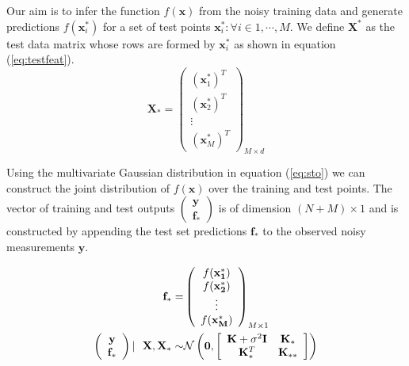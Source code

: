 Our aim is to infer the function $f(\mathbf{x})$ from the noisy training data and generate predictions $f(\mathbf{x}^{*}_i)$ for a set of test points $ {\mathbf{x}^{*}_i : \forall i \in 1, \cdots, M} $. We define $\mathbf{X}^*$ as the test data matrix whose rows are formed by $\mathbf{x}^{*}_i$ as shown in equation (\ref{eq:testfeat}). 
\begin{equation}
    \mathbf{X}_* = \left( \begin{array}{c} (\mathbf{x}^{*}_1)^T \\ (\mathbf{x}^{*}_2)^T \\ \vdots \\ (\mathbf{x}^{*}_M)^T \end{array} \right)_{M \times d} \label{eq:testfeat} 
\end{equation}

Using the multivariate Gaussian distribution in equation (\ref{eq:sto}) we can construct the joint distribution of $f(\mathbf{x})$ over the training and test points. The vector of training and test outputs $\left( \begin{array}{c} \mathbf{y} \\ \mathbf{f_*} \end{array} \right)$ is of dimension $(N+M) \times 1$ and is constructed by appending the test set predictions $\mathbf{f}_*$ to the observed noisy measurements $\mathbf{y}$.

\begin{align}
    \mathbf{f}_* = & \left( \begin{array}{c} f(\mathbf{x^{*}_1}) \\ f(\mathbf{x^{*}_2}) \\ \vdots \\ f(\mathbf{x^{*}_M}) \end{array} \right)_{M \times 1} \\
     \vspace{4\baselineskip}
    \left( \begin{array}{c} \mathbf{y} \\ \mathbf{f_*} \end{array} \right) | \ \ \mathbf{X}, \mathbf{X}_* \sim & 
    \mathcal{N}\left(\mathbf{0}, \left[ \begin{array}{cc} \mathbf{K} + \sigma^{2} \mathbf{I} & \mathbf{K}_{*} \\ \mathbf{K}_{*}^T & \mathbf{K}_{**} \end{array} \right ] \right) \label{eq:dist}
\end{align}


